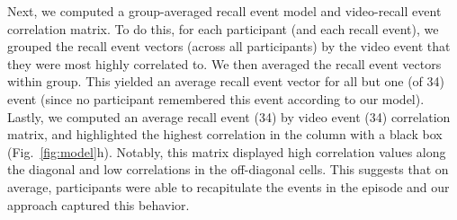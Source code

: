 \documentclass{article}
\begin{document}
{Next, we computed a group-averaged recall event model and video-recall event correlation matrix.  To do this, for each participant (and each recall event), we grouped the recall event vectors (across all participants) by the video event that they were most highly correlated to. We then averaged the recall event vectors within group. This yielded an average recall event vector for all but one (of 34) event (since no participant remembered this event according to our model). Lastly, we computed an average recall event (34) by video event (34) correlation matrix, and highlighted the highest correlation in the column with a black box (Fig.~\ref{fig:model}h). Notably, this matrix displayed high correlation values along the diagonal and low correlations in the off-diagonal cells. This suggests that on average, participants were able to recapitulate the events in the episode and our approach captured this behavior.

}
\end{document}
